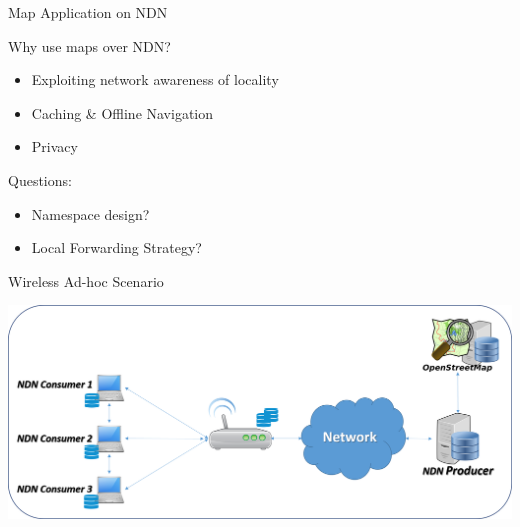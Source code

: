 

\begin{frame}{Map Application on NDN}

Why use maps over NDN?
\begin{itemize}
\item Exploiting network awareness of locality
\pause
\item Caching \& Offline Navigation
\pause
\item Privacy
\end{itemize}

\pause
Questions:
\begin{itemize}
\item Namespace design?
\pause
\item Local Forwarding Strategy?
\end{itemize}

	
\end{frame}



\begin{frame}{Wireless Ad-hoc Scenario}
\begin{center}
\includegraphics[width=\linewidth]{images/topo2.png}
\end{center}

\end{frame}




